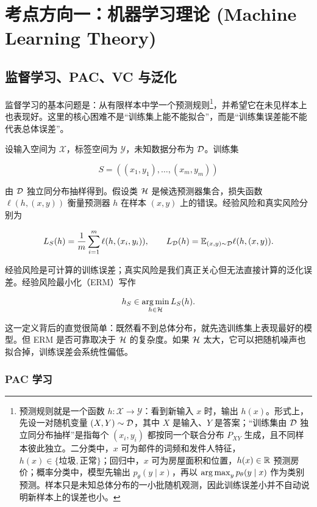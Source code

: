 \chapter{考点方向一：机器学习理论 (Machine Learning Theory)}
\label{ch:ml_theory}

\section{监督学习、PAC、VC 与泛化}

\teaching
监督学习的基本问题是：从有限样本中学一个预测规则\footnote{预测规则就是一个函数 \(h:\mathcal{X}\to\mathcal{Y}\)：看到新输入 \(x\) 时，输出 \(h(x)\)。形式上，先设一对随机变量 \((X,Y)\sim\mathcal{D}\)，其中 \(X\) 是输入、\(Y\) 是答案；“训练集由 \(\mathcal{D}\) 独立同分布抽样”是指每个 \((x_i,y_i)\) 都按同一个联合分布 \(P_{XY}\) 生成，且不同样本彼此独立。二分类中，\(x\) 可为邮件的词频和发件人特征，\(h(x)\in\{\text{垃圾},\text{正常}\}\)；回归中，\(x\) 可为房屋面积和位置，\(h(x)\in\mathbb{R}\) 预测房价；概率分类中，模型先输出 \(p_\theta(y\mid x)\)，再以 \(\operatorname*{arg\,max}_y p_\theta(y\mid x)\) 作为类别预测。样本只是未知总体分布的一小批随机观测，因此训练误差小并不自动说明新样本上的误差也小。}，并希望它在未见样本上也表现好。这里的核心困难不是“训练集上能不能拟合”，而是“训练集误差能不能代表总体误差”。

设输入空间为 \(\mathcal{X}\)，标签空间为 \(\mathcal{Y}\)，未知数据分布为 \(\mathcal{D}\)。训练集

\[
  S=((x_1,y_1),\ldots,(x_m,y_m))
\]

由 \(\mathcal{D}\) 独立同分布抽样得到。假设类 \(\mathcal{H}\) 是候选预测器集合，损失函数 \(\ell(h,(x,y))\) 衡量预测器 \(h\) 在样本 \((x,y)\) 上的错误。经验风险和真实风险分别为

\[
  L_S(h)=\frac1m\sum_{i=1}^{m}\ell(h,(x_i,y_i)),
  \qquad
  L_{\mathcal{D}}(h)=\mathbb{E}_{(x,y)\sim\mathcal{D}}\ell(h,(x,y)).
\]

经验风险是可计算的训练误差；真实风险是我们真正关心但无法直接计算的泛化误差。经验风险最小化（ERM）写作

\[
  h_S\in \operatorname*{arg\,min}_{h\in\mathcal{H}}L_S(h).
\]

这一定义背后的直觉很简单：既然看不到总体分布，就先选训练集上表现最好的模型。但 ERM 是否可靠取决于 \(\mathcal{H}\) 的复杂度。如果 \(\mathcal{H}\) 太大，它可以把随机噪声也拟合掉，训练误差会系统性偏低。

\subsection{PAC 学习}


